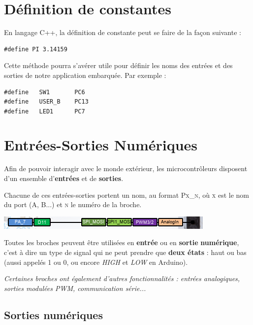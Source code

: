 \documentclass[a4paper,11pt,titlepage]{article} %
\begin{document}
\section{Définition de constantes}

En langage C++, la définition de constante peut se faire de la façon suivante :

\begin{lstlisting}
#define PI 3.14159
\end{lstlisting}

Cette méthode pourra s'avérer utile pour définir les noms des entrées et des sorties de notre application embarquée. Par exemple :

\begin{lstlisting}
#define   SW1       PC6
#define   USER_B    PC13
#define   LED1      PC7
\end{lstlisting}

\newpage
\section{Entrées-Sorties Numériques}

Afin de pouvoir interagir avec le monde extérieur, les microcontrôleurs disposent d'un ensemble d'\textbf{entrées} et de \textbf{sorties}. 

Chacune de ces entrées-sorties portent un nom, au format \textsc{Px\_n}, où \textsc{x} est le nom du port (A, B...) et \textsc{n} le numéro de la broche.

\begin{center}
	\includegraphics{images/nucleo_pin_functions.png}
\end{center}

Toutes les broches peuvent être utilisées en \textbf{entrée} ou en \textbf{sortie} \textbf{numérique}, c'est à dire un type de signal qui ne peut prendre que \textbf{deux états} : haut ou bas (aussi appelés 1 ou 0, ou encore \textit{HIGH} et \textit{LOW} en Arduino). 

\textit{Certaines broches ont également d'autres fonctionnalités : entrées analogiques, sorties modulées PWM, communication série...}

\subsection{Sorties numériques}
\end{document}
